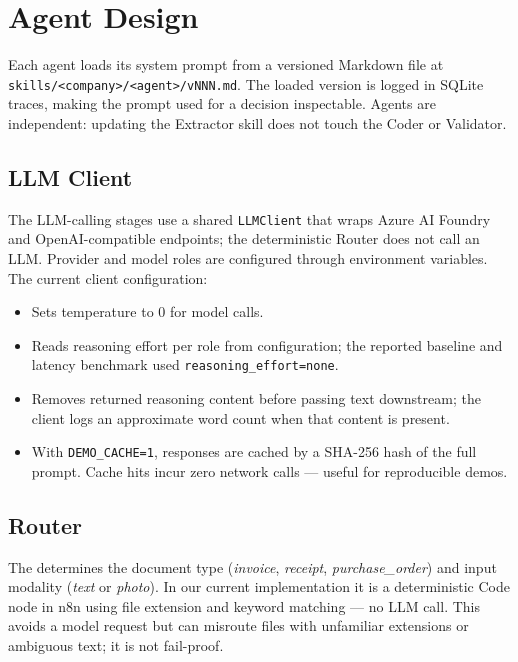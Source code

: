 \section{Agent Design}
\label{sec:agents}

Each agent loads its system prompt from a versioned Markdown file at
\texttt{skills/<company>/<agent>/vNNN.md}. The loaded version is logged in
SQLite traces, making the prompt used for a decision inspectable. Agents are
independent: updating the Extractor skill does not touch the Coder or Validator.

\subsection{LLM Client}

The LLM-calling stages use a shared \texttt{LLMClient} that wraps Azure AI
Foundry and OpenAI-compatible endpoints; the deterministic Router does not call
an LLM. Provider and model roles are configured through environment variables.
The current client configuration:
\begin{itemize}[leftmargin=*, itemsep=1pt]
  \item Sets temperature to 0 for model calls.
  \item Reads reasoning effort per role from configuration; the reported
        baseline and latency benchmark used \texttt{reasoning\_effort=none}.
  \item Removes returned reasoning content before passing text downstream;
        the client logs an approximate word count when that content is present.
  \item With \texttt{DEMO\_CACHE=1}, responses are cached by a SHA-256 hash
        of the full prompt. Cache hits incur zero network calls — useful for
        reproducible demos.
\end{itemize}

\subsection{Router}

The  determines the document type (\textit{invoice}, \textit{receipt},
\textit{purchase\_order}) and input modality (\textit{text} or \textit{photo}).
In our current implementation it is a deterministic Code node in n8n using file
extension and keyword matching — no LLM call. This avoids a model request but
can misroute files with unfamiliar extensions or ambiguous text; it is not
fail-proof.

